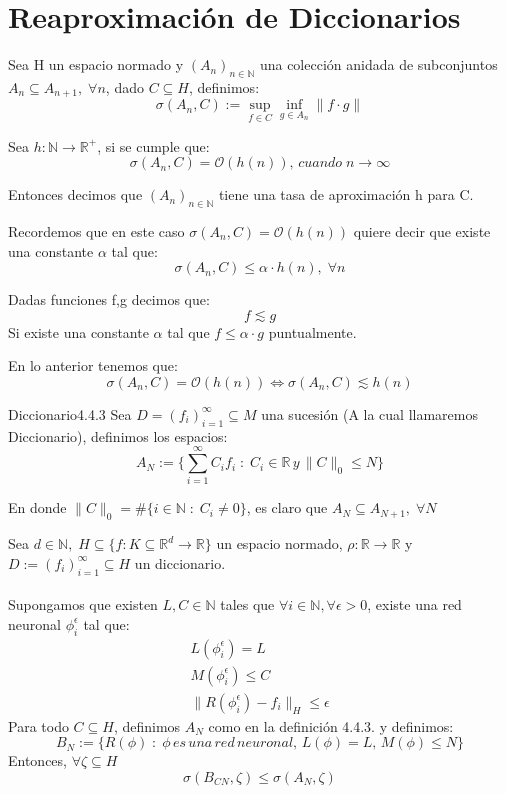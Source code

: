 \documentclass[12pt,a4paper]{book}
\providecommand{\norm}[1]{\lVert#1\rVert}
\providecommand{\conj}[1]{\lbrace#1\rbrace}
\begin{document}
\section{Reaproximación de Diccionarios}
\begin{definicion}{}{}
Sea H un espacio normado y $(A_{n})_{n\in\mathbb{N}}$ una colección anidada de subconjuntos $A_{n}\subseteq A_{n+1},\;\forall n$, dado $C\subseteq H$, definimos:
$$\sigma(A_{n},C):= \sup_{f\in C}\inf_{g\in A_{n}}\norm{f\cdot g}$$

Sea $h:\mathbb{N}\rightarrow\mathbb{R}^{+}$, si se cumple que:
$$\sigma(A_{n},C)=\mathcal{O}(h(n)),\,cuando\;n\rightarrow\infty$$

Entonces decimos que $(A_{n})_{n\in\mathbb{N}}$ tiene una tasa de aproximación h para C.
\end{definicion}
Recordemos que en este caso $\sigma(A_{n}, C)=\mathcal{O}(h(n))$ quiere decir que existe una constante $\alpha$ tal que: $$\sigma(A_{n}, C)\leq \alpha\cdot h(n),\;\forall n$$
\begin{definicion}{}{}
Dadas funciones f,g decimos que: $$f\lesssim g$$ Si existe una constante $\alpha$ tal que $f\leq \alpha\cdot g$ puntualmente.
\end{definicion}
En lo anterior tenemos que: $$\sigma(A_{n}, C)=\mathcal{O}(h(n))\Leftrightarrow \sigma(A_{n}, C) \lesssim h(n)$$
\begin{definicion}{Diccionario}{4.4.3}
\label{Dic}
Sea $D=(f_{i})^{\infty}_{i=1}\subseteq M$ una sucesión (A la cual llamaremos Diccionario), definimos los espacios: $$A_{N}:=\conj{\sum_{i=1}^{\infty}C_{i}f_{i}\;:\;C_{i}\in\mathbb{R}\,y\,\norm{C}_{0}\leq N}$$

En donde $\norm{C}_{0}=\#\conj{i\in\mathbb{N}\;:\; C_{i}\neq 0}$, es claro que $A_{N}\subseteq A_{N+1},\;\forall N$
\end{definicion}
\begin{teorema}{}{}
Sea $d\in\mathbb{N},\;H\subseteq\conj{f:K\subseteq\mathbb{R}^{d}\rightarrow\mathbb{R}}$ un espacio normado, $\rho:\mathbb{R}\rightarrow\mathbb{R}$ y $D:=(f_{i})_{i=1}^{\infty}\subseteq H$ un diccionario.\\
\\
Supongamos que existen $L,C\in\mathbb{N}$ tales que $\forall i\in\mathbb{N}, \forall \epsilon > 0$, existe una red neuronal $\phi_{i}^{\epsilon}$ tal que:
\begin{equation*}
\begin{split}
L(\phi_{i}^{\epsilon})=L\\
M(\phi_{i}^{\epsilon})\leq C\\
\norm{R(\phi_{i}^{\epsilon})-f_{i}}_{H}\leq\epsilon
\end{split}
\end{equation*}
Para todo $C\subseteq H$, definimos $A_{N}$ como en la definición 4.4.3. y definimos:
$$B_{N}:=\conj{R(\phi)\;:\; \phi\,es\,una\,red\,neuronal,\,L(\phi)=L,\,M(\phi)\leq N}$$
Entonces, $\forall\zeta\subseteq H$
$$\sigma(B_{CN},\zeta)\leq \sigma(A_{N},\zeta)$$
\end{teorema}
\end{document}
